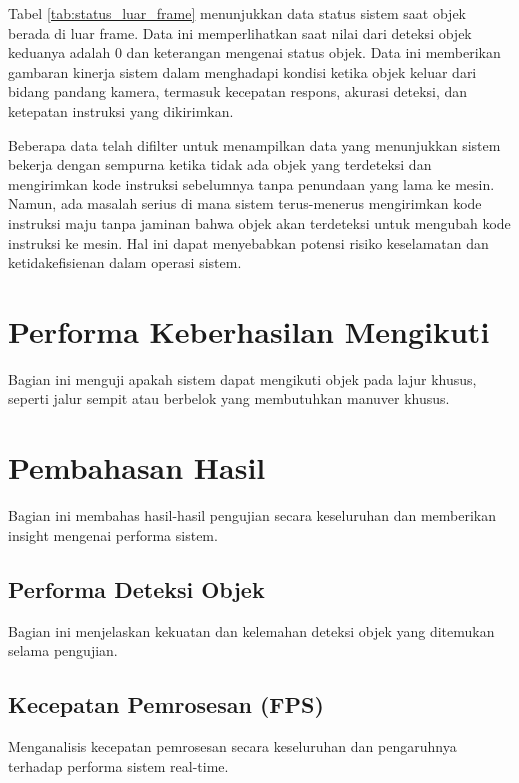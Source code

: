 Tabel \ref{tab:status_luar_frame} menunjukkan data status sistem saat objek berada di luar frame. Data ini memperlihatkan saat nilai dari deteksi objek keduanya adalah 0 dan keterangan mengenai status objek. Data ini memberikan gambaran kinerja sistem dalam menghadapi kondisi ketika objek keluar dari bidang pandang kamera, termasuk kecepatan respons, akurasi deteksi, dan ketepatan instruksi yang dikirimkan.

Beberapa data telah difilter untuk menampilkan data yang menunjukkan sistem bekerja dengan sempurna ketika tidak ada objek yang terdeteksi dan mengirimkan kode instruksi sebelumnya tanpa penundaan yang lama ke mesin. Namun, ada masalah serius di mana sistem terus-menerus mengirimkan kode instruksi maju tanpa jaminan bahwa objek akan terdeteksi untuk mengubah kode instruksi ke mesin. Hal ini dapat menyebabkan potensi risiko keselamatan dan ketidakefisienan dalam operasi sistem.

\section{Performa Keberhasilan Mengikuti}
\label{sec:performamengikuti}

Bagian ini menguji apakah sistem dapat mengikuti objek pada lajur khusus, seperti jalur sempit atau berbelok yang membutuhkan manuver khusus.

\section{Pembahasan Hasil}
\label{sec:pembahasanhasil}

Bagian ini membahas hasil-hasil pengujian secara keseluruhan dan memberikan insight mengenai performa sistem.

\subsection{Performa Deteksi Objek}
\label{sec:performadeteksiobjek}

Bagian ini menjelaskan kekuatan dan kelemahan deteksi objek yang ditemukan selama pengujian.

\subsection{Kecepatan Pemrosesan (FPS)}
\label{sec:kecepatanpemrosesan}

Menganalisis kecepatan pemrosesan secara keseluruhan dan pengaruhnya terhadap performa sistem real-time.

